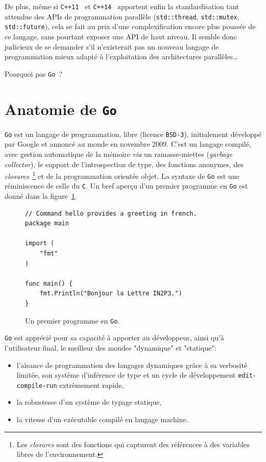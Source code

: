 \documentclass[a4paper,french]{article}
\begin{document}
De plus, m\^eme si \texttt{C++11}~\cite{ref-cxx11} et
\texttt{C++14}~\cite{ref-cxx14} apportent enfin la standardisation tant attendue
des APIs de programmation parall\`ele (\texttt{std::thread},
\texttt{std::mutex}, \texttt{std::future}), cela se fait au prix d'une
complexification encore plus pouss\'ee de ce langage, sans pourtant exposer une
API de haut niveau.
Il semble donc judicieux de se demander s'il n'existerait pas un nouveau langage
de programmation mieux adapt\'e \`a l'exploitation des architectures
parall\`eles\ldots

Pourquoi pas \texttt{Go}~\cite{ref-golang}?

\section*{Anatomie de \texttt{Go}}

\texttt{Go} est un langage de programmation, libre (licence \texttt{BSD-3}),
initialement d\'evelopp\'e par Google et annonc\'e au monde en novembre 2009.
C'est un langage compil\'e, avec gestion automatique de la m\'emoire \emph{via} un
ramasse-miettes (\emph{garbage collector}), le support de l'introspection de
type, des fonctions anonymes, des \emph{closures}~\footnote{Les \emph{closures}
sont des fonctions qui capturent des r\'ef\'erences \`a des variables libres
de l'environnement.} et de la programmation orient\'ee objet.
La syntaxe de \texttt{Go} est une r\'eminiscence de celle du \texttt{C}.
Un bref aper\c cu d'un premier programme en \texttt{Go} est donn\'e dans la
figure~\ref{fig-go-hello}.

\begin{figure}[h]
\begin{verbatim}
// Command hello provides a greeting in french.
package main

import (
	"fmt"
)

func main() {
	fmt.Println("Bonjour la Lettre IN2P3.")
}
\end{verbatim}
\caption{\label{fig-go-hello}Un premier programme en \texttt{Go}.}
\end{figure}

\texttt{Go} est appr\'eci\'e pour sa capacit\'e \`a apporter au d\'eveloppeur,
ainsi qu'\`a l'utili\-sa\-teur final, le meilleur des mondes "dynamique" et
"statique":
\begin{itemize}
	\item l'aisance de programmation des langages dynamiques gr\^ace \`a sa
		verbosit\'e limit\'ee, son syst\`eme d'inf\'erence de type et un cycle
		de d\'eveloppement \texttt{edit-compile-run} extr\^emement rapide,
	\item la robustesse d'un syst\`eme de typage statique,
	\item la vitesse d'un ex\'ecutable compil\'e en langage machine.
\end{itemize}
\end{document}
